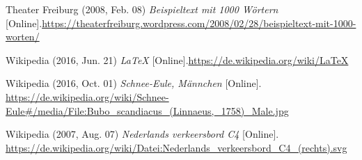 \documentclass{scrreprt}
\begin{document}
\newpage

\begin{thebibliography}{mmmmmmm}
	 Theater Freiburg (2008, Feb. 08) \textit{Beispieltext mit 1000 Wörtern} [Online].\newline \url{https://theaterfreiburg.wordpress.com/2008/02/28/beispieltext-mit-1000-worten/} 
	
	 Wikipedia (2016, Jun. 21) \textit{LaTeX} [Online].\newline \url{https://de.wikipedia.org/wiki/LaTeX} 
	
	 Wikipedia (2016, Oct. 01) \textit{Schnee-Eule, Männchen} [Online]. \newline
	\url{https://de.wikipedia.org/wiki/Schnee-Eule#/media/File:Bubo_scandiacus_(Linnaeus,_1758)_Male.jpg}
	
	 Wikipedia (2007, Aug. 07) \textit{Nederlands verkeersbord C4} [Online]. \newline
	\url{https://de.wikipedia.org/wiki/Datei:Nederlands_verkeersbord_C4_(rechts).svg}
	
	
	
\end{thebibliography}
\end{document}
